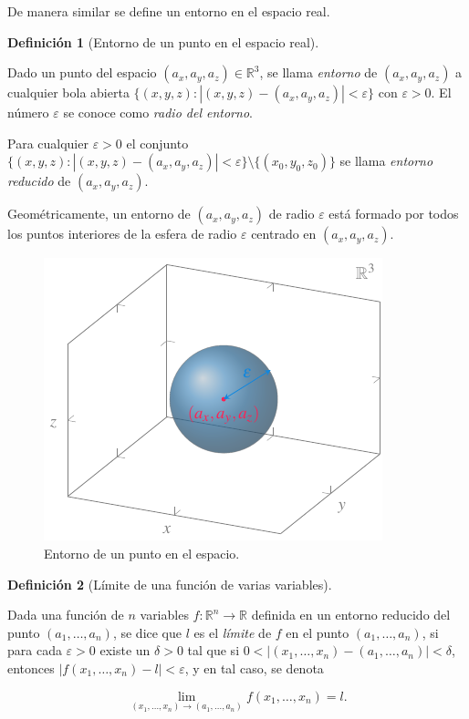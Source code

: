 \documentclass[
  a4paper,
]{scrreport}
\theoremstyle{definition}
\newtheorem{definition}{Definición}[chapter]
\theoremstyle{plain}
\theoremstyle{plain}
\theoremstyle{definition}
\theoremstyle{definition}
\theoremstyle{plain}
\theoremstyle{remark}
\begin{document}
De manera similar se define un entorno en el espacio real.

\begin{definition}[Entorno de un punto en el espacio
real]\protect\hypertarget{def-entorno-punto-espacio}{}\label{def-entorno-punto-espacio}

Dado un punto del espacio \((a_x,a_y,a_z)\in \mathbb{R}^3\), se llama
\emph{entorno} de \((a_x,a_y,a_z)\) a cualquier bola abierta
\(\{(x,y,z):|(x,y,z)-(a_x,a_y,a_z)|<\varepsilon\}\) con
\(\varepsilon>0\). El número \(\varepsilon\) se conoce como \emph{radio
del entorno}.

Para cualquier \(\varepsilon>0\) el conjunto
\(\{(x,y,z):|(x,y,z)-(a_x,a_y,a_z)|<\varepsilon\}\setminus \{(x_0,y_0,z_0)\}\)
se llama \emph{entorno reducido} de \((a_x,a_y,a_z)\).

\end{definition}

Geométricamente, un entorno de \((a_x,a_y,a_z)\) de radio
\(\varepsilon\) está formado por todos los puntos interiores de la
esfera de radio \(\varepsilon\) centrado en \((a_x,a_y,a_z)\).

\begin{figure}

{\centering \includegraphics{img/derivadas-funciones-varias-variables/entorno-punto-espacio.pdf}

}

\caption{Entorno de un punto en el espacio.}

\end{figure}

\begin{definition}[Límite de una función de varias
variables]\protect\hypertarget{def-limite-funcion-varias-variables}{}\label{def-limite-funcion-varias-variables}

Dada una función de \(n\) variables
\(f:\mathbb{R}^n\rightarrow \mathbb{R}\) definida en un entorno reducido
del punto \((a_1, \ldots, a_n)\), se dice que \(l\) es el \emph{límite}
de \(f\) en el punto \((a_1, \ldots, a_n)\), si para cada
\(\varepsilon>0\) existe un \(\delta>0\) tal que si
\(0<|(x_1,\ldots,x_n)-(a_1,\ldots,a_n)|<\delta\), entonces
\(|f(x_1,\ldots,x_n)-l|<\varepsilon\), y en tal caso, se denota

\[
\lim_{(x_1,\ldots,x_n)\rightarrow (a_1,\ldots,a_n)}f(x_1,\ldots,x_n) = l.
\]

\end{definition}
\end{document}
